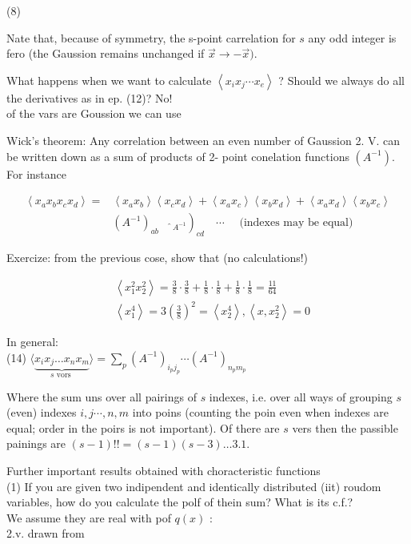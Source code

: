 \documentclass[10pt]{article}
\begin{document}
(8)

Nate that, because of symmetry, the s-point carrelation for $s$ any odd integer is fero (the Gaussion remains unchanged if $\vec{x} \rightarrow-\vec{x})$.

What happens when we want to calculate $\left\langle x_{i} x_{j} \cdots x_{e}\right\rangle$ ? Should we always do all the derivatives as in ep. (12)? No!\\
of the vars are Goussion we can use

Wick's theorem: Any correlation between an even number of Gaussion 2. V. can be written down as a sum of products of 2- point conelation functions $\left(A^{-1}\right)$.\\
For instance

$$
\begin{aligned}
\left\langle x_{a} x_{b} x_{c} x_{d}\right\rangle= & \left\langle x_{a} x_{b}\right\rangle\left\langle x_{c} x_{d}\right\rangle+\left\langle x_{a} x_{c}\right\rangle\left\langle x_{b} x_{d}\right\rangle+\left\langle x_{a} x_{d}\right\rangle\left\langle x_{b} x_{c}\right\rangle \\
& \left.\left(A^{-1}\right)_{a b} \quad \hat{~}_{A^{-1}}\right)_{c d} \quad \cdots \quad \text { (indexes may be equal) }
\end{aligned}
$$

Exercize: from the previous cose, show that (no calculations!)

$$
\begin{aligned}
& \left\langle x_{1}^{2} x_{2}^{2}\right\rangle=\frac{3}{8} \cdot \frac{3}{8}+\frac{1}{8} \cdot \frac{1}{8}+\frac{1}{8} \cdot \frac{1}{8}=\frac{11}{64} \\
& \left\langle x_{1}^{4}\right\rangle=3\left(\frac{3}{8}\right)^{2}=\left\langle x_{2}^{4}\right\rangle,\left\langle x, x_{2}^{2}\right\rangle=0
\end{aligned}
$$

In general:\\
(14) $\langle\underbrace{x_{i} x_{j} \ldots x_{n} x_{m}}_{s \text { vors }}\rangle=\sum_{p}\left(A^{-1}\right)_{i_{p} j_{p}} \cdots\left(A^{-1}\right)_{n_{p} m_{p}}$

Where the sum uns over all pairings of $s$ indexes, i.e. over all ways of grouping $s$ (even) indexes $i, j \cdots, n, m$ into poins (counting the poin even when indexes are equal; order in the poirs is not important). Of there are $s$ vers then the passible painings are $(s-1)!!=(s-1)(s-3) \ldots 3.1$.

Further important results obtained with choracteristic functions\\
(1) If you are given two indipendent and identically distributed (iit) roudom variables, how do you calculate the polf of thein sum? What is its c.f.?\\
We assume they are real with pof $q(x)$ :\\
2.v. drawn from
\end{document}
